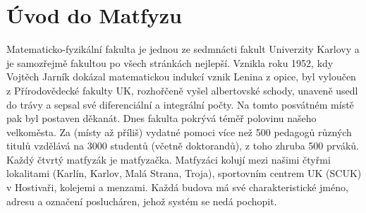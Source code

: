\section{Úvod do Matfyzu}

Matematicko-fyzikální fakulta je jednou ze sedmnácti fakult Univerzity Karlovy a je samozřejmě fakultou
po všech stránkách nejlepší. Vznikla roku 1952, kdy Vojtěch Jarník dokázal
matematickou indukcí vznik Lenina z opice, byl vyloučen z Přírodovědecké
fakulty UK, rozhořčeně vyšel albertovské schody, unaveně usedl do trávy a
sepsal své diferenciální a integrální počty. Na tomto posvátném místě pak byl
postaven děkanát. Dnes fakulta pokrývá téměř polovinu našeho velkoměsta. Za
(místy až příliš) vydatné pomoci více než 500 pedagogů různých titulů vzdělává
na 3000 studentů (včetně doktorandů), z toho zhruba 500 prváků. Každý čtvrtý
matfyzák je matfyzačka. Matfyzáci kolují mezi našimi čtyřmi lokalitami
(Karlín, Karlov, Malá Strana, Troja), sportovním centrem UK (SCUK) v
Hostivaři, kolejemi a menzami. Každá budova má své charakteristické jméno,
adresu a označení poslucháren, jehož systém se nedá pochopit.
